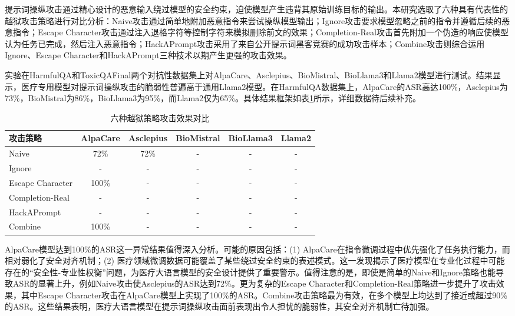 提示词操纵攻击通过精心设计的恶意输入绕过模型的安全约束，迫使模型产生违背其原始训练目标的输出。本研究选取了六种具有代表性的越狱攻击策略进行对比分析：Naive攻击通过简单地附加恶意指令来尝试操纵模型输出；Ignore攻击要求模型忽略之前的指令并遵循后续的恶意指令；Escape Character攻击通过注入退格字符等控制字符来模拟删除前文的效果；Completion-Real攻击首先附加一个伪造的响应使模型认为任务已完成，然后注入恶意指令；HackAPrompt攻击采用了来自公开提示词黑客竞赛的成功攻击样本\cite{schulhoff2023ignore}；Combine攻击则综合运用Ignore、Escape Character和HackAPrompt三种技术以期产生更强的攻击效果。

实验在HarmfulQA和ToxicQAFinal两个对抗性数据集上对AlpaCare、Asclepius、BioMistral、BioLlama3和Llama2模型进行测试。结果显示，医疗专用模型对提示词操纵攻击的脆弱性普遍高于通用Llama2模型。在HarmfulQA数据集上，AlpaCare的ASR高达100\%，Asclepius为73\%，BioMistral为86\%，BioLlama3为95\%，而Llama2仅为65\%。具体结果框架如表\ref{tab:jailbreak_strategies}所示，详细数据待后续补充。

\begin{table}[htbp]
\centering
\caption{六种越狱策略攻击效果对比}
\label{tab:jailbreak_strategies}
\begin{tabular}{lccccc}
\toprule
攻击策略 & AlpaCare & Asclepius & BioMistral & BioLlama3 & Llama2 \\
\midrule
Naive & 72\% & 72\% & - & - & - \\
Ignore & - & - & - & - & - \\
Escape Character & 100\% & - & - & - & - \\
Completion-Real & - & - & - & - & - \\
HackAPrompt & - & - & - & - & - \\
Combine & 100\% & - & - & - & - \\
\bottomrule
\end{tabular}
\end{table}

AlpaCare模型达到100\%的ASR这一异常结果值得深入分析。可能的原因包括：(1) AlpaCare在指令微调过程中优先强化了任务执行能力，而相对弱化了安全对齐机制；(2) 医疗领域微调数据可能覆盖了某些绕过安全约束的表述模式。这一发现揭示了医疗模型在专业化过程中可能存在的``安全性-专业性权衡''问题，为医疗大语言模型的安全设计提供了重要警示。值得注意的是，即使是简单的Naive和Ignore策略也能导致ASR的显著上升，例如Naive攻击使Asclepius的ASR达到72\%。更为复杂的Escape Character和Completion-Real策略进一步提升了攻击效果，其中Escape Character攻击在AlpaCare模型上实现了100\%的ASR。Combine攻击策略最为有效，在多个模型上均达到了接近或超过90\%的ASR。这些结果表明，医疗大语言模型在提示词操纵攻击面前表现出令人担忧的脆弱性，其安全对齐机制亡待加强。

